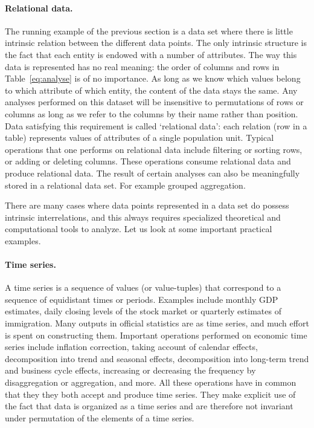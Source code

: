 \paragraph{Relational data.} 
The running example of the previous section is a data set where there is little
intrinsic relation between the different data points. The only intrinsic
structure is the fact that each entity is endowed with a number of attributes.
The way this data is represented has no real meaning: the order of columns and
rows in Table~\ref{eq:analyse} is of no importance. As long as we know which
values belong to which attribute of which entity, the content of the data stays
the same. Any analyses performed on this dataset will be insensitive to
permutations of rows or columns as long as we refer to the columns by their
name rather than position. Data satisfying this requirement is called
`relational data': each relation (row in a table) represents values of
attributes of a single population unit. Typical operations that one performs on
relational data include filtering or sorting rows, or adding or deleting
columns. These operations consume relational data and produce relational data.
The result of certain analyses can also be meaningfully stored in a relational
data set. For example grouped aggregation.

There are many cases where data points represented in a data set do possess
intrinsic interrelations, and this always requires specialized theoretical and
computational tools to analyze. Let us look at some important practical
examples.

\paragraph{Time series.} A time series is a sequence of values (or
value-tuples) that correspond to a sequence of equidistant times or periods.
Examples include monthly GDP estimates, daily closing levels of the stock
market or quarterly estimates of immigration. Many outputs in official
statistics are as time series,  and much effort is spent on constructing them.
Important operations performed on economic time series include inflation
correction, taking account of calendar effects, decomposition into trend and
seasonal effects, decomposition into long-term trend and business cycle
effects, increasing or decreasing the frequency by disaggregation or
aggregation, and more. All these operations have in common that they they both
accept and produce time series. They make explicit use of the fact that data is
organized as a time series and are therefore not invariant under permutation of
the elements of a time series.

